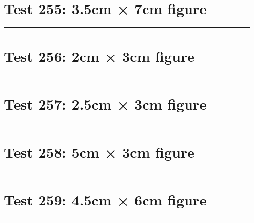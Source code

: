 \documentclass[a4paper,11pt]{article}
\begin{document}
\section*{Test 255: 3.5cm × 7cm figure}
\begin{swarmwrap}%
  \begin{minipage}[t]{3cm}
    \centering
    \rule{\linewidth}{7cm}
  \end{minipage}%
\end{swarmwrap}%
\swarmwrapnext
\lipsum[140]
\lipsum[141]
\lipsum[142]
\lipsum[143]
\lipsum[144]
\lipsum[145]
\section*{Test 256: 2cm × 3cm figure}
\begin{swarmwrap}%
  \begin{minipage}[t]{2cm}
    \centering
    \rule{\linewidth}{3cm}
  \end{minipage}%
\end{swarmwrap}%
\swarmwrapnext
\lipsum[75]
\lipsum[76]
\lipsum[77]
\lipsum[78]
\section*{Test 257: 2.5cm × 3cm figure}
\begin{swarmwrap}%
  \begin{minipage}[t]{2cm}
    \centering
    \rule{\linewidth}{3cm}
  \end{minipage}%
\end{swarmwrap}%
\swarmwrapnext
\lipsum[27]
\lipsum[28]
\lipsum[29]
\lipsum[30]
\lipsum[31]
\lipsum[32]
\section*{Test 258: 5cm × 3cm figure}
\begin{swarmwrap}%
  \begin{minipage}[t]{5cm}
    \centering
    \rule{\linewidth}{3cm}
  \end{minipage}%
\end{swarmwrap}%
\swarmwrapnext
\lipsum[44]
\lipsum[45]
\lipsum[46]
\lipsum[47]
\lipsum[48]
\lipsum[49]
\section*{Test 259: 4.5cm × 6cm figure}
\begin{swarmwrap}%
  \begin{minipage}[t]{4cm}
    \centering
    \rule{\linewidth}{6cm}
  \end{minipage}%
\end{swarmwrap}%
\swarmwrapnext
\lipsum[13]
\lipsum[14]
\lipsum[15]
\end{document}
